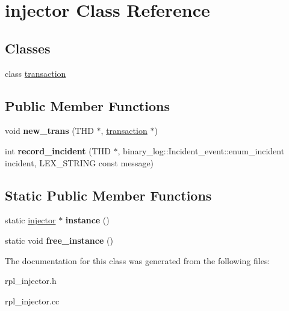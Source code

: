 \hypertarget{classinjector}{}\section{injector Class Reference}
\label{classinjector}
\subsection*{Classes}
\begin{DoxyCompactItemize}
\item 
class \mbox{\hyperlink{classinjector_1_1transaction}{transaction}}
\end{DoxyCompactItemize}
\subsection*{Public Member Functions}
\begin{DoxyCompactItemize}
\item 
\mbox{\label{classinjector_ab7e589476ea1ad7c4a54c73ea109f7ea}} 
void {\bfseries new\+\_\+trans} (T\+HD $\ast$, \mbox{\hyperlink{classinjector_1_1transaction}{transaction}} $\ast$)
\item 
\mbox{\label{classinjector_a7e030f012f0ceb8be2da6b4433226fac}} 
int {\bfseries record\+\_\+incident} (T\+HD $\ast$, binary\+\_\+log\+::\+Incident\+\_\+event\+::enum\+\_\+incident incident, L\+E\+X\+\_\+\+S\+T\+R\+I\+NG const message)
\end{DoxyCompactItemize}
\subsection*{Static Public Member Functions}
\begin{DoxyCompactItemize}
\item 
\mbox{\label{classinjector_a2e131dd017bf9c8250792e037ffe8883}} 
static \mbox{\hyperlink{classinjector}{injector}} $\ast$ {\bfseries instance} ()
\item 
\mbox{\label{classinjector_a8427aa66d0dc1e0dc679c8f528ebb5c3}} 
static void {\bfseries free\+\_\+instance} ()
\end{DoxyCompactItemize}


The documentation for this class was generated from the following files\+:\begin{DoxyCompactItemize}
\item 
rpl\+\_\+injector.\+h\item 
rpl\+\_\+injector.\+cc\end{DoxyCompactItemize}
